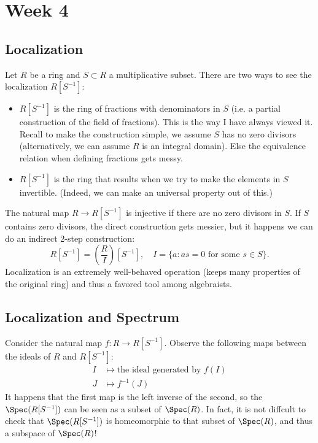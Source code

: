 \section{Week 4}

\subsection{Localization}

Let $R$ be a ring and $S \subset R$ a multiplicative subset. There are two ways to see the localization $R[S^{-1}]$:
\begin{itemize}
    \item $R[S^{-1}]$ is the ring of fractions with denominators in $S$ (i.e. a partial construction of the field of fractions). This is the way I have always viewed it. Recall to make the construction simple, we assume $S$ has no zero divisors (alternatively, we can assume $R$ is an integral domain). Else the equivalence relation when defining fractions gets messy.
    \item $R[S^{-1}]$ is the ring that results when we try to make the elements in $S$ invertible. (Indeed, we can make an universal property out of this.)
\end{itemize}
The natural map $R \to R[S^{-1}]$ is injective if there are no zero divisors in $S$. If $S$ contains zero divisors, the direct construction gets messier, but it happens we can do an indirect 2-step construction:
\[
    R[S^{-1}] = \left( \frac{R}{I} \right)[S^{-1}], \quad I = \{a: as = 0 \text{ for some } s \in S\}.
\]
Localization is an extremely well-behaved operation (keeps many properties of the original ring) and thus a favored tool among algebraists.

\subsection{Localization and Spectrum}
Consider the natural map $f: R \to R[S^{-1}]$. Observe the following maps between the ideals of $R$ and $R[S^{-1}]$:
\begin{align*}
    I &\mapsto \text{the ideal generated by } f(I)\\
    J &\mapsto f^{-1}(J)
\end{align*}
It happens that the first map is the left inverse of the second, so the $\Spec(R[S^{-1}])$ can be seen as a subset of $\Spec(R)$. In fact, it is not diffcult to check that $\Spec(R[S^{-1}])$ is homeomorphic to that subset of $\Spec(R)$, and thus a subspace of $\Spec(R)$!

